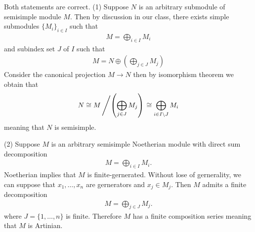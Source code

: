 \begin{solution}
    Both statements are correct.
    (1) Suppose $N$ is an arbitrary submodule of semisimple module $M$. Then by discussion in our class, there exists simple submodules $\{M_i\}_{i\in I}$
    such that 
    \begin{align*}
        M = \bigoplus_{i\in I} M_i 
    \end{align*}
    and subindex set $J$ of $I$ such that 
    \begin{align*}
        M= N\oplus  \left(\bigoplus_{j\in J} M_j\right)
    \end{align*}
    Consider the canonical projection $M\to N$ then by isomorphism theorem we obtain that 
    \begin{align*}
        N \cong M\left/ \left(\bigoplus_{j\in J} M_j\right) \right .\cong \bigoplus_{i\in I\setminus J} M_i 
    \end{align*}
    meaning that $N$ is semisimple.

    (2) Suppose $M$ is an arbitrary semisimple Noetherian module with direct sum decomposition
    \begin{align*}
        M = \bigoplus_{i\in I} M_i.
    \end{align*}
    Noetherian implies that $M$ is finite-gernerated. Without lose of gernerality, we can suppose that $x_1,\dots,x_n$ are gernerators and $x_j\in M_j$.
    Then $M$ admits a finite decomposition
    \begin{align*}
        M = \bigoplus_{j\in J} M_j.
    \end{align*}
    where $J=\{1,\dots,n\}$ is finite. Therefore $M$ has a finite composition series meaning that $M$ is Artinian.
\end{solution}

